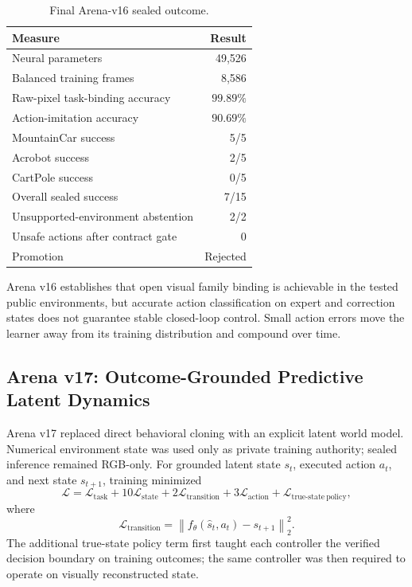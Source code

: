\begin{table}[htbp]
\centering
\caption{Final Arena-v16 sealed outcome.}
\label{tab:arena-v16-results}
\begin{tabular}{lr}
\hline
Measure & Result \\
\hline
Neural parameters & 49,526 \\
Balanced training frames & 8,586 \\
Raw-pixel task-binding accuracy & $99.89\%$ \\
Action-imitation accuracy & $90.69\%$ \\
MountainCar success & 5/5 \\
Acrobot success & 2/5 \\
CartPole success & 0/5 \\
Overall sealed success & 7/15 \\
Unsupported-environment abstention & 2/2 \\
Unsafe actions after contract gate & 0 \\
Promotion & Rejected \\
\hline
\end{tabular}
\end{table}

Arena v16 establishes that open visual family binding is achievable in the
tested public environments, but accurate action classification on expert and
correction states does not guarantee stable closed-loop control.  Small action
errors move the learner away from its training distribution and compound over
time.

\subsection{Arena v17: Outcome-Grounded Predictive Latent Dynamics}

Arena v17 replaced direct behavioral cloning with an explicit latent world
model.  Numerical environment state was used only as private training authority;
sealed inference remained RGB-only.  For grounded latent state $s_t$, executed
action $a_t$, and next state $s_{t+1}$, training minimized
\begin{equation}
 \mathcal{L}=
 \mathcal{L}_{\mathrm{task}}
 +10\mathcal{L}_{\mathrm{state}}
 +2\mathcal{L}_{\mathrm{transition}}
 +3\mathcal{L}_{\mathrm{action}}
 +\mathcal{L}_{\mathrm{true\mbox{-}state\ policy}},
\end{equation}
where
\begin{equation}
 \mathcal{L}_{\mathrm{transition}}
 =\left\|f_{\theta}(\hat{s}_t,a_t)-s_{t+1}\right\|_2^2 .
\end{equation}
The additional true-state policy term first taught each controller the verified
decision boundary on training outcomes; the same controller was then required
to operate on visually reconstructed state.

